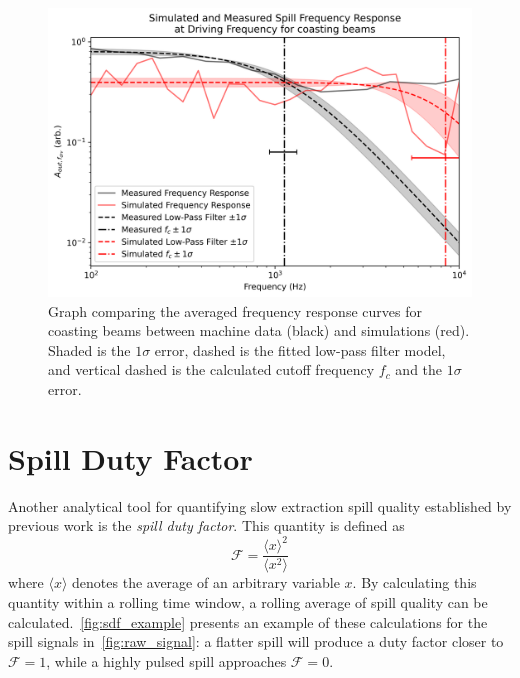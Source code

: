 \documentclass[a4paper,twoside,11pt]{report}
\begin{document}
\begin{figure}[!h]
  \centering
  \includegraphics*[width=0.8\linewidth]{simvmeas_coasting.png}
  \caption[Comparisons of machine and simulation data of RFKO with \textbf{coasting} beams]{Graph comparing the averaged frequency response curves for coasting beams between machine data (black) and simulations (red). Shaded is the $1\sigma$ error, dashed is the fitted low-pass filter model, and vertical dashed is the calculated cutoff frequency $f_c$ and the $1\sigma$ error.}\label{fig:simvmeas_coasting}
\end{figure}

\clearpage
\section{Spill Duty Factor}\label{results:sdf}

Another analytical tool for quantifying slow extraction spill quality established by previous work is the \textit{spill duty factor}. This quantity is defined as~\cite{Sorge_2018}
\begin{equation}
  \mathcal{F} = \frac{\langle x\rangle^2}{\langle x^2\rangle}
\end{equation} where $\langle x\rangle$ denotes the average of an arbitrary variable $x$. By calculating this quantity within a rolling time window, a rolling average of spill quality can be calculated.~\autoref{fig:sdf_example} presents an example of these calculations for the spill signals in~\autoref{fig:raw_signal}: a flatter spill will produce a duty factor closer to $\mathcal{F}=1$, while a highly pulsed spill approaches $\mathcal{F}=0$.
\end{document}
